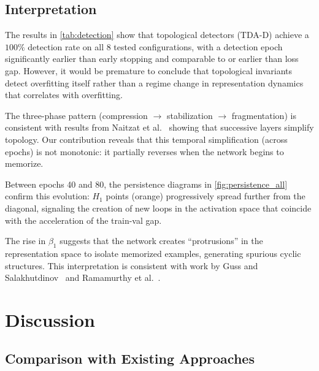 \documentclass[11pt,a4paper]{article}
\newcommand{\betti}{\beta}
\begin{document}
\subsection{Interpretation}
\label{subsec:interpretation}

The results in \cref{tab:detection} show that topological detectors (TDA-D)
achieve a $100\%$ detection rate on all 8 tested configurations, with a
detection epoch significantly earlier than early stopping and comparable to
or earlier than loss gap. However, it would be premature to conclude that
topological invariants detect overfitting itself rather than a regime
change in representation dynamics that correlates with overfitting.

The three-phase pattern (compression $\to$ stabilization $\to$ fragmentation)
is consistent with results from Naitzat et al.~\cite{naitzat2020topologydeepneuralnetworks}
showing that successive layers simplify topology. Our contribution reveals
that this temporal simplification (across epochs) is not monotonic:
it partially reverses when the network begins to memorize.

Between epochs 40 and 80, the persistence diagrams in \cref{fig:persistence_all}
confirm this evolution: $H_1$ points (orange) progressively spread further
from the diagonal, signaling the creation of new loops in the activation
space that coincide with the acceleration of the train-val gap.

The rise in $\betti_1$ suggests that the network creates ``protrusions'' in
the representation space to isolate memorized examples, generating spurious
cyclic structures. This interpretation is consistent with work by Guss and
Salakhutdinov~\cite{guss2018characterizingcapacityneuralnetworks} and Ramamurthy et
al.~\cite{ramamurthy2018topologicaldataanalysisdecision}.

\section{Discussion}
\label{sec:discussion}

\subsection{Comparison with Existing Approaches}
\label{subsec:comparaison}
\end{document}
